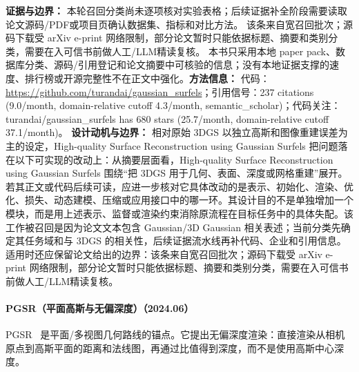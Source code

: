 \textbf{证据与边界：} 本轮召回分类尚未逐项核对实验表格；后续证据补全阶段需要读取论文源码/PDF或项目页确认数据集、指标和对比方法。 该条来自宽召回批次；源码下载受 arXiv e-print 网络限制，部分论文暂时只能依据标题、摘要和类别分类，需要在入可信书前做人工/LLM精读复核。 本书只采用本地 paper pack、数据库分类、源码/引用登记和论文摘要中可核验的信息；没有本地证据支撑的速度、排行榜或开源完整性不在正文中强化。\textbf{方法信息：} 代码：\url{https://github.com/turandai/gaussian\_surfels}；引用信号：237 citations (9.0/month, domain-relative cutoff 4.3/month, semantic\_scholar)；代码关注：turandai/gaussian\_surfels has 680 stars (25.7/month, domain-relative cutoff 37.1/month)。
\textbf{设计动机与边界：} 相对原始 3DGS 以独立高斯和图像重建误差为主的设定，High-quality Surface Reconstruction using Gaussian Surfels 把问题落在以下可实现的改动上：从摘要层面看，High-quality Surface Reconstruction using Gaussian Surfels 围绕“把 3DGS 用于几何、表面、深度或网格重建”展开。若其正文或代码后续可读，应进一步核对它具体改动的是表示、初始化、渲染、优化、损失、动态建模、压缩或应用接口中的哪一环。其设计目的不是单独增加一个模块，而是用上述表示、监督或渲染约束消除原流程在目标任务中的具体失配。该工作被召回是因为论文文本包含 Gaussian/3D Gaussian 相关表述；当前分类先确定其任务域和与 3DGS 的相关性，后续证据流水线再补代码、企业和引用信息。适用时还应保留论文给出的边界：该条来自宽召回批次；源码下载受 arXiv e-print 网络限制，部分论文暂时只能依据标题、摘要和类别分类，需要在入可信书前做人工/LLM精读复核。
\paragraph{PGSR（平面高斯与无偏深度）（2024.06）}
PGSR~\cite{2406_06521} 是平面/多视图几何路线的锚点。它提出无偏深度渲染：直接渲染从相机原点到高斯平面的距离和法线图，再通过比值得到深度，而不是使用高斯中心深度。


